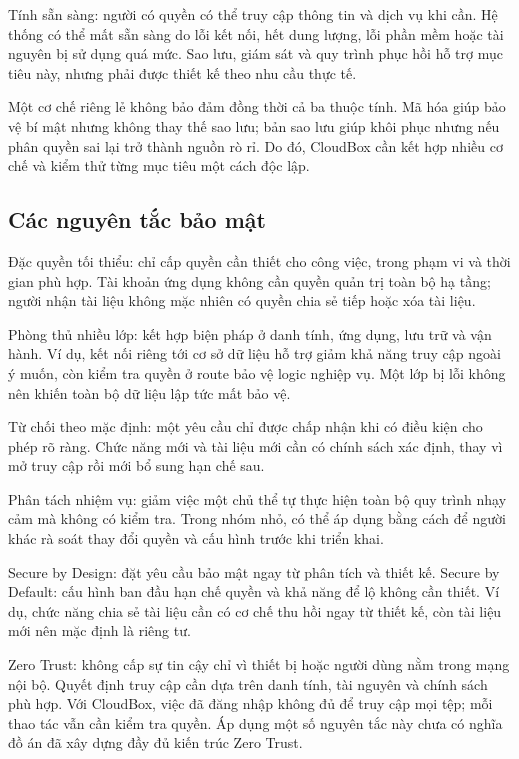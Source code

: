 Tính sẵn sàng: người có quyền có thể truy cập thông tin và dịch vụ khi cần. Hệ thống có thể mất sẵn sàng do lỗi kết nối, hết dung lượng, lỗi phần mềm hoặc tài nguyên bị sử dụng quá mức. Sao lưu, giám sát và quy trình phục hồi hỗ trợ mục tiêu này, nhưng phải được thiết kế theo nhu cầu thực tế.

Một cơ chế riêng lẻ không bảo đảm đồng thời cả ba thuộc tính. Mã hóa giúp bảo vệ bí mật nhưng không thay thế sao lưu; bản sao lưu giúp khôi phục nhưng nếu phân quyền sai lại trở thành nguồn rò rỉ. Do đó, CloudBox cần kết hợp nhiều cơ chế và kiểm thử từng mục tiêu một cách độc lập.

\subsection{Các nguyên tắc bảo mật}
Đặc quyền tối thiểu: chỉ cấp quyền cần thiết cho công việc, trong phạm vi và thời gian phù hợp. Tài khoản ứng dụng không cần quyền quản trị toàn bộ hạ tầng; người nhận tài liệu không mặc nhiên có quyền chia sẻ tiếp hoặc xóa tài liệu.

Phòng thủ nhiều lớp: kết hợp biện pháp ở danh tính, ứng dụng, lưu trữ và vận hành. Ví dụ, kết nối riêng tới cơ sở dữ liệu hỗ trợ giảm khả năng truy cập ngoài ý muốn, còn kiểm tra quyền ở route bảo vệ logic nghiệp vụ. Một lớp bị lỗi không nên khiến toàn bộ dữ liệu lập tức mất bảo vệ.

Từ chối theo mặc định: một yêu cầu chỉ được chấp nhận khi có điều kiện cho phép rõ ràng. Chức năng mới và tài liệu mới cần có chính sách xác định, thay vì mở truy cập rồi mới bổ sung hạn chế sau.

Phân tách nhiệm vụ: giảm việc một chủ thể tự thực hiện toàn bộ quy trình nhạy cảm mà không có kiểm tra. Trong nhóm nhỏ, có thể áp dụng bằng cách để người khác rà soát thay đổi quyền và cấu hình trước khi triển khai.

Secure by Design: đặt yêu cầu bảo mật ngay từ phân tích và thiết kế. Secure by Default: cấu hình ban đầu hạn chế quyền và khả năng để lộ không cần thiết. Ví dụ, chức năng chia sẻ tài liệu cần có cơ chế thu hồi ngay từ thiết kế, còn tài liệu mới nên mặc định là riêng tư.

Zero Trust: không cấp sự tin cậy chỉ vì thiết bị hoặc người dùng nằm trong mạng nội bộ. Quyết định truy cập cần dựa trên danh tính, tài nguyên và chính sách phù hợp. Với CloudBox, việc đã đăng nhập không đủ để truy cập mọi tệp; mỗi thao tác vẫn cần kiểm tra quyền. Áp dụng một số nguyên tắc này chưa có nghĩa đồ án đã xây dựng đầy đủ kiến trúc Zero Trust.\cite{zerotrust}

